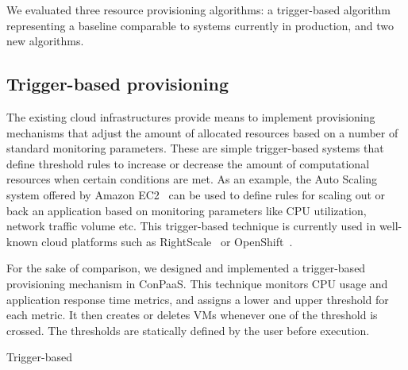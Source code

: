 We evaluated three resource provisioning algorithms: a trigger-based
algorithm representing a baseline comparable to systems currently in
production, and two new algorithms.


\subsection*{Trigger-based provisioning}




The existing cloud infrastructures provide means to implement
provisioning mechanisms that adjust the amount of allocated 
resources based on a number of standard monitoring parameters. 
These are simple trigger-based systems that define threshold 
rules to increase or decrease the amount of computational resources
when certain conditions are met. As an example, the Auto Scaling 
system offered by Amazon EC2~\cite{amazonEC2} can be used to define 
rules for scaling out or back an application based on monitoring
parameters like CPU utilization, network traffic volume etc. 
This trigger-based technique is currently used in well-known 
cloud platforms such as RightScale~\cite{right-scale} or OpenShift~\cite{openshift}. 

For the sake of comparison, we designed and implemented a
trigger-based provisioning mechanism in ConPaaS. This technique
monitors CPU usage and application response time metrics, and assigns
a lower and upper threshold for each metric. It then creates or
deletes VMs whenever one of the threshold is crossed. The thresholds
are statically defined by the user before execution.

\begin{algorithm} 
{\scriptsize
\SetAlgoLined
\SetInd{0mm}{2mm}
\BlankLine
\While{auto-scaling is ON}{
Collect monitoring data of each metric, \emph{data$_i$}\;
\BlankLine
\If{ no recent scaling operation}{
\uIf{ avg(data$_i$) $>=$ \emph{SLO\_threshold\_min}$_i$ for at least one metric }{
ADD resources\;
}
\ElseIf{ avg(data$_i$) $<$ \emph{SLO\_threshold\_max}$_i$ for all metrics }{
REMOVE resources\;
} 
} 
Sleep for 5 minutes \; 
}
}
\caption{Trigger-based}
\label{triggerBased_prov}
\end{algorithm}


